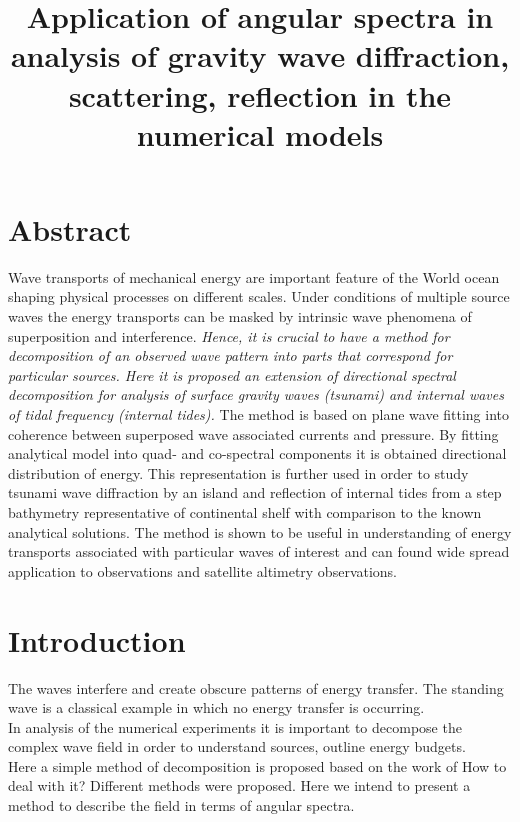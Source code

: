 



\title{Application of angular spectra in analysis of gravity wave diffraction, scattering, reflection in the numerical models}
\maketitle

\section{Abstract}
Wave transports of mechanical energy are important feature of the World ocean shaping physical processes on different scales. Under conditions of multiple source waves the energy transports can be masked by intrinsic wave phenomena of superposition and interference. \textit{Hence, it is crucial to have a method for decomposition of an observed wave pattern into parts that correspond for particular sources. Here it is proposed an extension of directional spectral decomposition for analysis of surface gravity waves (tsunami) and internal waves of tidal frequency (internal tides).} The method is based on plane wave fitting into coherence between superposed wave associated currents and pressure. By fitting analytical model into quad- and co-spectral components it is obtained directional distribution of energy. This representation is further used in order to study tsunami wave diffraction by an island and reflection of internal tides from a step bathymetry representative of continental shelf with comparison to the known analytical solutions. The method is shown to be useful in understanding of energy transports associated with particular waves of interest and can found wide spread application to observations and satellite altimetry observations.

\section{Introduction}
The waves interfere and create obscure patterns of energy transfer. The standing wave is a classical example in which no energy transfer is occurring.\\
In analysis of the numerical experiments it is important to decompose the complex wave field in order to understand sources, outline energy budgets.\\
Here a simple method of decomposition is proposed based on the work of \cite{long1979variational}
How to deal with it? Different methods were proposed. Here we intend to present a method to describe the field in terms of angular spectra.

